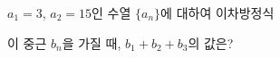 $a_1=3$, $a_2=15$인 수열 $\{a_n\}$에 대하여 이차방정식\par\smallskip{}\par\smallskip\noindent 이 중근 $b_n$을 가질 때, $b_1+b_2+b_3$의 값은?
